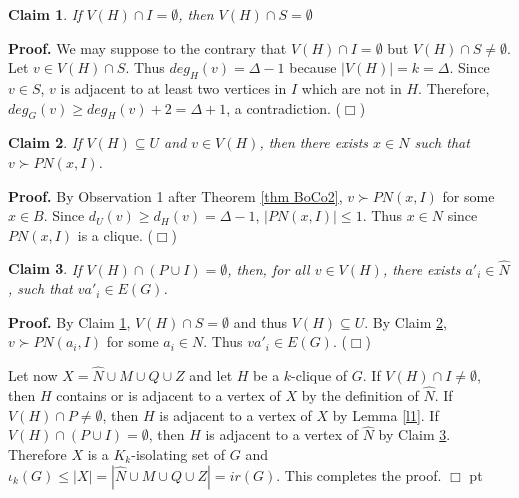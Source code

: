 \documentclass[11pt]{article}
\newtheorem{claim}{Claim}
\newcommand{\qed}{$\Box$}
\newcommand{\smallqed}{{\tiny ($\Box$)}}
\newcommand{\proof}{\noindent\textbf{Proof. }}
\newcommand{\2}{ \vspace{0.2cm} }
\newcommand{\1}{ \vspace{0.1cm} }
\begin{document}
\begin{claim}
\label{c1}
If $V(H) \cap I = \emptyset$, then $V(H) \cap S = \emptyset$
\end{claim}
\proof
We may suppose to the contrary that $V(H) \cap I = \emptyset$ but $V(H) \cap S \neq \emptyset$. Let $v \in V(H) \cap S$. Thus $deg_{H}(v) = \Delta - 1$ because $|V(H)| = k = \Delta$. Since $v \in S$, $v$ is adjacent to at least two vertices in $I$ which are not in $H$. Therefore, $deg_{G}(v) \geq deg_{H}(v) + 2 = \Delta + 1$, a contradiction.
\smallqed

\begin{claim}
\label{c2}
If $V(H) \subseteq U$ and $v \in V(H)$, then there exists $x \in N$ such that $v \succ PN(x, I)$.
\end{claim}
\proof
By Observation
1 after Theorem \ref{thm BoCo2}, $v \succ PN(x, I)$ for some $x \in B$.
Since $d_U(v)\ge d_H(v)=\Delta -1$, $|PN(x,I)|\le 1$. Thus $x\in N$
since $PN(x,I)$ is a clique.
\smallqed

\begin{claim}
\label{c4}
If $V(H) \cap (P \cup I) = \emptyset$, then, for all $v \in V(H)$, there exists $a'_{i} \in \hat{N}$, such that $va'_{i} \in E(G)$.
\end{claim}
\proof
By Claim \ref{c1}, $V(H)\cap S=\emptyset$ and thus $V(H) \subseteq U.$  By Claim \ref{c2}, $v \succ PN(a_{i}, I)$ for some $a_{i} \in N$. Thus $va'_{i} \in E(G)$.
\smallqed

\indent Let now $X = \hat{N} \cup M \cup Q \cup Z$ and let $H$ be a $k$-clique of $G$. If $V(H)\cap I \neq \emptyset$, then $H$ contains or is adjacent to a vertex of $X$ by the definition of $\hat{N}$. If $V(H)\cap P \neq \emptyset$, then $H$ is adjacent to a vertex of $X$ by Lemma \ref{l1}. If $V(H) \cap (P \cup I) = \emptyset$, then $H$ is adjacent to a vertex of $\hat{N}$ by Claim \ref{c4}. Therefore $X$ is a $K_k$-isolating set of $G$ and $\iota_{k}(G) \leq |X| = |\hat{N} \cup M \cup Q \cup Z| = ir(G)$. This completes the proof.
\qed
{} pt

\end{document}
